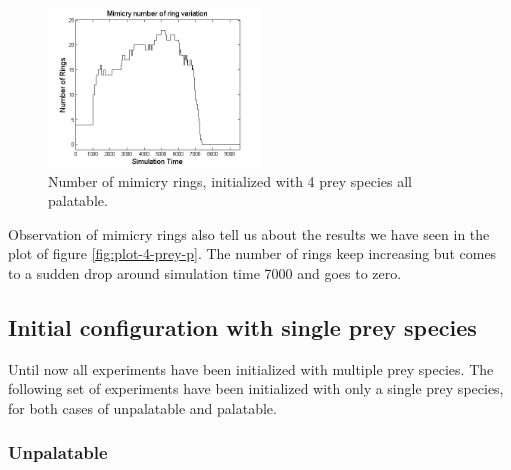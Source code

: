 \documentclass[letterpaper]{article}
\numberwithin{equation}{section}
\begin{document}
\begin{figure}[H]
	\centering
	\includegraphics[width=0.5\textwidth]{../tex/images/ringSize10k-4Prey-p}
	\caption[Number of mimicry rings (4 prey species all palatable)]{Number of mimicry rings, initialized with 4 prey species all palatable.}
	\label{fig:ringSize8k-4-Prey-p}
\end{figure}

Observation of mimicry rings also tell us about the results we have seen in the plot of figure \ref{fig:plot-4-prey-p}. The number of rings keep increasing but comes to a sudden drop around simulation time 7000 and goes to zero.

\subsection{Initial configuration with single prey species}
Until now all experiments have been initialized with multiple prey species. The following set of experiments have been initialized with only a single prey species, for both cases of unpalatable and palatable.

\subsubsection{Unpalatable}
\label{subsubsec:single-prey-unpalatable}
\end{document}

